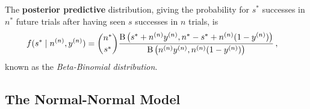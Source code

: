 


The \textbf{posterior predictive} distribution, giving the probability for $s^*$ successes in $n^*$ future trials
after having seen $s$ successes in $n$ trials, is
\begin{align*}
f(s^* \mid n^{(n)}, y^{(n)}) &= {n^* \choose s^*} \frac{\operatorname{B}\big(s^* + n^{(n)} y^{(n)}, n^* - s^* + n^{(n)} (1 - y^{(n)})\big)}{\operatorname{B}\big(n^{(n)}y^{(n)}, n^{(n)} (1 - y^{(n)})\big)}\,,
\end{align*}
known as the \emph{Beta-Binomial distribution}.


\subsection{The Normal-Normal Model}
\label{sec:norm-norm}

